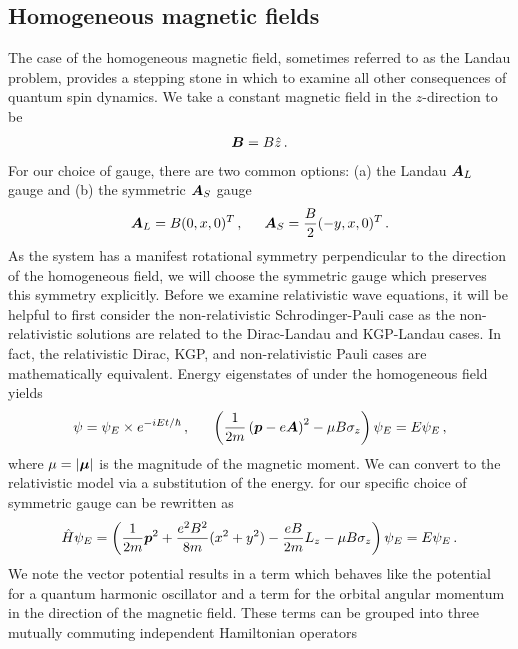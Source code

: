 \subsection{Homogeneous magnetic fields}
\label{sec:homogeneous}
\noindent The case of the homogeneous magnetic field, sometimes referred to as the Landau problem, provides a stepping stone in which to examine all other consequences of quantum spin dynamics. We take a constant magnetic field in the $z$-direction to be
\begin{alignat}{1}
	\label{eq:homogeneous:01} \boldsymbol{B}=B\hat{z}\,.
\end{alignat}
For our choice of gauge, there are two common options: (a) the Landau $\boldsymbol{A}_{L}$ gauge and (b) the symmetric $\boldsymbol{A}_{S}$ gauge
\begin{alignat}{1}
	\label{eq:homogeneous:02} \bb{A}_{L}=B(0,x,0)^{T}\,,\indent \bb{A}_{S}=\frac{B}{2}(-y,x,0)^{T}\,.
\end{alignat}
As the system has a manifest rotational symmetry perpendicular to the direction of the homogeneous field, we will choose the symmetric gauge which preserves this symmetry explicitly. Before we examine relativistic wave equations, it will be helpful to first consider the non-relativistic Schrodinger-Pauli case as the non-relativistic solutions are related to the Dirac-Landau and KGP-Landau cases. In fact, the relativistic Dirac, KGP, and non-relativistic Pauli cases are mathematically equivalent. Energy eigenstates of  under the homogeneous field  yields
\begin{alignat}{1}
	\label{eq:homogeneous:03} \psi=\psi_{E}\times e^{-iEt/\hbar}\,,\indent\left(\frac{1}{2m}\left(\bb{p}-e\bb{A}\right)^{2}-\mu B\sigma_{z}\right)\psi_{E}=E\psi_{E}\,,
\end{alignat}
where $\mu=|\boldsymbol{\mu}|$ is the magnitude of the magnetic moment. We can convert to the relativistic model via a substitution of the energy.  for our specific choice of symmetric gauge  can be rewritten as
\begin{alignat}{1}
	\label{eq:homogeneous:04} \hat{H}\psi_{E}=\left(\frac{1}{2m}\boldsymbol{p}^{2}+\frac{e^{2}B^{2}}{8m}(x^{2}+y^{2})-\frac{eB}{2m}L_{z}-\mu B\sigma_{z}\right)\psi_{E}=E\psi_{E}\,.
\end{alignat}
We note the vector potential results in a term which behaves like the potential for a quantum harmonic oscillator and a term for the orbital angular momentum in the direction of the magnetic field. These terms can be grouped into three mutually commuting independent Hamiltonian operators
